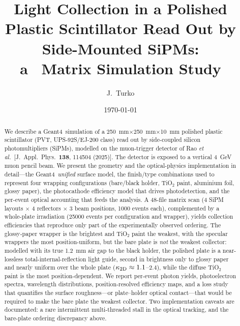 \documentclass[11pt,a4paper]{article}
\title{\vspace{-1.2cm}\bfseries Light Collection in a Polished Plastic Scintillator Read Out by Side-Mounted SiPMs:\\ a \gfour\ Matrix Simulation Study}
\author{J.~Turko}
\date{\today}
\newcommand{\gfour}{Geant4}
\begin{document}
\maketitle

\begin{abstract}
\noindent
We describe a \gfour\ simulation of a \SI{250}{\milli\meter}$\times$\SI{250}{\milli\meter}$\times$\SI{10}{\milli\meter} polished
plastic scintillator (PVT, UPS-92S/EJ-200 class) read out by side-coupled
silicon photomultipliers (SiPMs), modelled on the muon-trigger detector of
Rao \emph{et al.}\ [J.~Appl.\ Phys.\ \textbf{138}, 114504 (2025)]. The detector
is exposed to a vertical \SI{4}{\giga\electronvolt} muon pencil beam. We present
the geometry and the optical-physics implementation in detail---the
\gfour\ \emph{unified} surface model, the finish/type combinations used to
represent four wrapping configurations (bare/black holder, TiO$_2$ paint,
aluminium foil, glossy paper), the photocathode efficiency model that drives
photodetection, and the per-event optical accounting that feeds the analysis.
A \num{48}-file matrix scan (4 SiPM layouts $\times$ 4 reflectors $\times$
3 beam positions, \num{1000} events each), complemented by a whole-plate
irradiation (\num{25000} events per configuration and wrapper), yields
collection efficiencies that reproduce only part of the experimentally observed
ordering. The glossy-paper wrapper is the brightest and TiO$_2$ paint the
weakest, with the specular wrappers the most position-uniform, but the bare
plate is \emph{not} the weakest collector: modelled with its true
\SI{1.2}{\milli\meter} air gap to the black holder, the polished plate is a
near-lossless total-internal-reflection light guide, second in brightness only
to glossy paper and nearly uniform over the whole plate
($\kappa_{\rm 2D}\approx\num{1.1}$--$\num{2.4}$), while the diffuse TiO$_2$
paint is the most position-dependent. We report per-event photon yields, photoelectron spectra,
wavelength distributions, position-resolved efficiency maps, and a loss study
that quantifies the surface roughness---or plate--holder optical
contact---that would be required to make the bare plate the weakest collector.
Two implementation caveats are documented: a rare intermittent multi-threaded
stall in the optical tracking, and the bare-plate ordering discrepancy above.
\end{abstract}

\tableofcontents
\vspace{0.5em}

\end{document}
